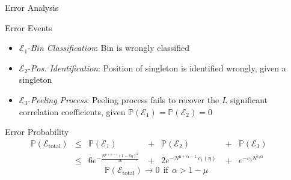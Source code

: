 \documentclass[10pt,xcolor=table]{beamer}
\newcommand{\mc}{\mathcal}
\newcommand{\mbb}{\mathbb}
\begin{document}
\begin{frame}{Error Analysis}

\begin{block}{Error Events}
		\begin{itemize}\small
			\item {\color{blue}$\mathcal{E}_1${-\it Bin Classification}}: Bin is wrongly classified
			\item {\color{blue}$\mathcal{E}_2${-\it Pos. Identification}}: Position of singleton is identified wrongly, given a singleton
			\item {\color{red}$\mathcal{E}_3${-\it Peeling Process}}: Peeling process fails to recover the $L$ significant correlation coefficients, given $\mbb{P}(\mc{E}_1)= \mbb{P}(\mc{E}_2)=0$
		\end{itemize}
\end{block}

\begin{block}{Error Probability}
		\begin{align*}
		\mbb{P}(\mc{E}_{\text{total}}) & \leq &  \mbb{P}(\mc{E}_1)~~~~~ & + & \mbb{P}(\mc{E}_2)~~~~~~~~ & + & \mbb{P}(\mc{E}_3)~~~~~~~~\\
		&\leq & 6e^{-\frac{N^{\mu+\alpha-1}(1-6\eta)^2}{16}}~ & + & 2e^{-N^{\mu+\alpha-1} ~ c_1(\eta)}~ & + &  e^{-c_3 N^{c_4\alpha}}
		\end{align*}
		\[\boxed{	\mbb{P}(\mc{E}_{\text{total}}) \rightarrow 0  ~~\text{if}~~  \alpha >1-\mu}\]
\end{block}
	
\end{frame}
\end{document}
